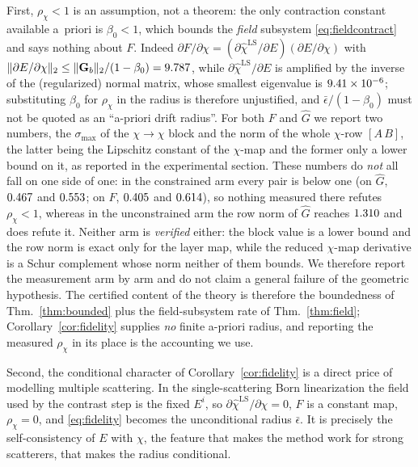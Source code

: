 \documentclass[journal,cmes,article,submit,moreauthors,pdftex]{Definitions/tsp}
\newcommand{\norm}[1]{\lVert #1 \rVert}
\newcommand{\numv}[1]{#1}
\begin{document}
First, $\rho_\chi<1$ is an assumption, not a theorem: the only contraction constant available
a~priori is $\beta_0<1$, which bounds the \emph{field} subsystem \eqref{eq:fieldcontract} and says
nothing about $F$. Indeed
$\partial F/\partial\chi=(\partial\hat\chi^{\mathrm{LS}}/\partial E)(\partial E/\partial\chi)$ with
$\norm{\partial E/\partial\chi}_2\le\norm{\mathbf{G}_b}_2/(1-\beta_0)=\numv{\NumdEdChi}$, while
$\partial\hat\chi^{\mathrm{LS}}/\partial E$ is amplified by the inverse of the (regularized) normal
matrix, whose smallest eigenvalue is $\numv{\NumLamMin}$; substituting $\beta_0$ for $\rho_\chi$ in
the radius is therefore unjustified, and $\bar\epsilon/(1-\beta_0)$ must not be quoted as an
``a-priori drift radius''. For both $F$ and $\hat G$ we report two numbers, the $\sigma_{\max}$ of
the $\chi\!\to\!\chi$ block and the norm of the whole $\chi$-row $[A\,B]$, the latter being the
Lipschitz constant of the $\chi$-map and the former only a lower bound on it, as reported in the
experimental section. These numbers do \emph{not} all fall on one side of one: in the constrained arm
every pair is below one (on $\hat G$, $\numv{\NumRhoChiCons}$ and $\numv{\NumChiLipRowCons}$; on $F$,
$\numv{\NumChiFBlockCons}$ and $\numv{\NumChiLipRowFCons}$), so nothing measured there refutes
$\rho_\chi<1$, whereas in the unconstrained arm the row norm of $\hat G$ reaches
$\numv{\NumChiLipRowUnc}$ and does refute it. Neither arm is \emph{verified} either: the block value is
a lower bound and the row norm is exact only for the layer map, while the reduced $\chi$-map derivative
is a Schur complement whose norm neither of them bounds. We therefore report the measurement arm by
arm and do not claim a general failure of the geometric hypothesis. The certified content of the theory is therefore
the boundedness of Thm.~\ref{thm:bounded} plus the field-subsystem rate of
Thm.~\ref{thm:field};
Corollary~\ref{cor:fidelity} supplies \emph{no} finite a-priori radius, and reporting the measured
$\rho_\chi$ in its place is the accounting we use.

Second, the conditional character of Corollary~\ref{cor:fidelity} is a direct price of modelling
multiple scattering. In the single-scattering Born linearization the field used by the contrast
step is the fixed $E^i$, so $\partial\hat\chi^{\mathrm{LS}}/\partial\chi=0$, $F$ is a constant map,
$\rho_\chi=0$, and \eqref{eq:fidelity} becomes the unconditional radius $\bar\epsilon$. It is
precisely the self-consistency of $E$ with $\chi$, the feature that makes the method work for
strong scatterers, that makes the radius conditional.
\end{document}
